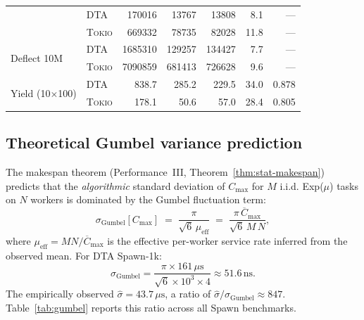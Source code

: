 \documentclass[11pt,a4paper]{article}
\newcommand{\dtact}{\textsc{DTA}}
\newcommand{\tokio}{\textsc{Tokio}}
\begin{document}
\begin{table}[htbp]
\begin{tabularx}{\linewidth}{@{}lXrrrrr@{}}
  & \dtact  & 170016 & 13767 & 13808 &  8.1 & ---   \\
  & \tokio  & 669332 & 78735 & 82028 & 11.8 & ---   \\
\multirow{2}{*}{Deflect 10M}
  & \dtact  & 1685310 & 129257 & 134427 &  7.7 & ---   \\
  & \tokio  & 7090859 & 681413 & 726628 &  9.6 & ---   \\
\midrule
\multirow{2}{*}{Yield (10$\times$100)}
  & \dtact  & 838.7  & 285.2 & 229.5 & 34.0 & 0.878 \\
  & \tokio  & 178.1  &  50.6 &  57.0 & 28.4 & 0.805 \\
\bottomrule
\end{tabularx}
\end{table}

\subsection{Theoretical Gumbel variance prediction}

The makespan theorem (Performance~III, Theorem~\ref{thm:stat-makespan}) predicts
that the \emph{algorithmic} standard deviation of $C_{\max}$ for $M$ i.i.d.
Exp($\mu$) tasks on $N$ workers is dominated by the Gumbel fluctuation term:
\begin{equation}
  \sigma_{\mathrm{Gumbel}}[C_{\max}]
  \;=\; \frac{\pi}{\sqrt{6}\,\mu_{\mathrm{eff}}}
  \;=\; \frac{\pi\,\overline{C}_{\max}}{\sqrt{6}\,M\,N},
  \label{eq:gumbel_std_pred}
\end{equation}
where $\mu_{\mathrm{eff}} = MN/\overline{C}_{\max}$ is the effective per-worker
service rate inferred from the observed mean.  For \dtact{} Spawn-1k:
\[
  \sigma_{\mathrm{Gumbel}}
  = \frac{\pi \times 161\,\mu\mathrm{s}}{\sqrt{6}\times 10^3 \times 4}
  \approx 51.6\,\mathrm{ns}.
\]
The empirically observed $\hat\sigma = 43.7\,\mu\mathrm{s}$, a ratio of
$\hat\sigma/\sigma_{\mathrm{Gumbel}} \approx 847$.  Table~\ref{tab:gumbel}
reports this ratio across all Spawn benchmarks.
\end{document}
